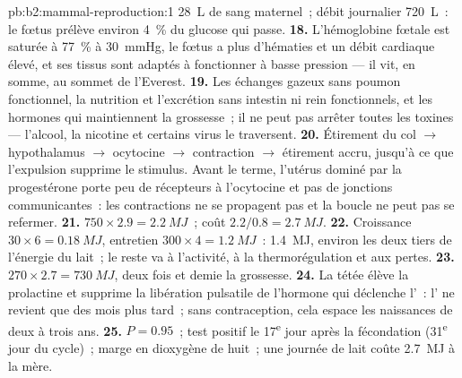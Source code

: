 \begin{solution}{pb:b2:mammal-reproduction:1}
\qty{28}{L} de sang maternel~; débit journalier \qty{720}{L}~: le fœtus
prélève environ \qty{4}{\%} du glucose qui passe.
\textbf{18.} L'hémoglobine fœtale est saturée à \qty{77}{\%} à
\qty{30}{mmHg}, le fœtus a plus d'hématies et un débit cardiaque élevé,
et ses tissus sont adaptés à fonctionner à basse pression --- il vit, en
somme, au sommet de l'Everest.
\textbf{19.} Les échanges gazeux sans poumon fonctionnel, la nutrition
et l'excrétion sans intestin ni rein fonctionnels, et les hormones qui
maintiennent la grossesse~; il ne peut pas arrêter toutes les toxines
--- l'alcool, la nicotine et certains virus le traversent.
\textbf{20.} Étirement du col $\to$ hypothalamus $\to$ ocytocine $\to$
contraction $\to$ étirement accru, jusqu'à ce que l'expulsion supprime
le stimulus. Avant le terme, l'utérus dominé par la progestérone porte
peu de récepteurs à l'ocytocine et pas de jonctions communicantes~: les
contractions ne se propagent pas et la boucle ne peut pas se refermer.
\textbf{21.} $750\times 2.9 = \qty{2.2}{MJ}$~; coût $2.2/0.8 =
\qty{2.7}{MJ}$.
\textbf{22.} Croissance $30\times 6 = \qty{0.18}{MJ}$, entretien
$300\times 4 = \qty{1.2}{MJ}$~: \qty{1.4}{MJ}, environ les deux tiers de
l'énergie du lait~; le reste va à l'activité, à la thermorégulation et
aux pertes.
\textbf{23.} $270\times 2.7 = \qty{730}{MJ}$, deux fois et demie la
grossesse.
\textbf{24.} La tétée élève la prolactine et supprime la libération
pulsatile de l'hormone qui déclenche l'~: l' ne
revient que des mois plus tard~; sans contraception, cela espace les
naissances de deux à trois ans.
\textbf{25.} $P = 0.95$~; test positif le 17\textsuperscript{e} jour
après la fécondation (31\textsuperscript{e} jour du cycle)~; marge en
dioxygène de huit~; une journée de lait coûte \qty{2.7}{MJ} à la mère.
\end{solution}
